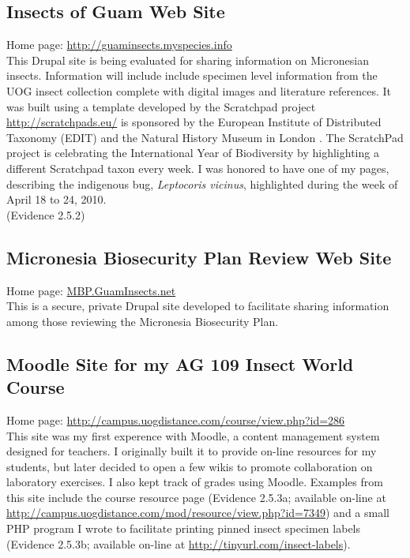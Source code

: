 \documentclass[12pt,oneside,english]{scrbook}
\begin{document}
\subsection{Insects of Guam Web Site}

Home page: \url{http://guaminsects.myspecies.info}\textbf{}\\
This Drupal site is being evaluated for sharing information on Micronesian
insects. Information will include include specimen level information
from the UOG insect collection complete with digital images and literature
references. It was built using a template developed by the Scratchpad
project \url{http://scratchpads.eu/} is sponsored by the European
Institute of Distributed Taxonomy (EDIT) and the Natural History Museum
in London . The ScratchPad project is celebrating the International
Year of Biodiversity by highlighting a different Scratchpad taxon
every week. I was honored to have one of my pages, describing the
indigenous bug, \textit{Leptocoris vicinus}, highlighted during the
week of April 18 to 24, 2010.\\
(Evidence 2.5.2)

\subsection{Micronesia Biosecurity Plan Review Web Site}

Home page: \url{MBP.GuamInsects.net}\\
This is a secure, private Drupal site developed to facilitate sharing
information among those reviewing the Micronesia Biosecurity Plan.

\subsection{Moodle Site for my AG 109 Insect World Course}

Home page: \url{http://campus.uogdistance.com/course/view.php?id=286}\\
This site was my first experence with Moodle, a content management
system designed for teachers. I originally built it to provide on-line
resources for my students, but later decided to open a few wikis to
promote collaboration on laboratory exercises. I also kept track of
grades using Moodle. Examples from this site include the course resource
page (Evidence 2.5.3a; available on-line at \url{http://campus.uogdistance.com/mod/resource/view.php?id=7349})
and a small PHP program I wrote to facilitate printing pinned insect
specimen labels (Evidence 2.5.3b; available on-line at \url{http://tinyurl.com/insect-labels}).
\end{document}
